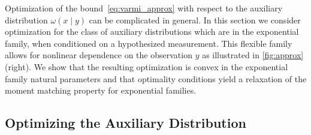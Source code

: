 

Optimization of the bound~\eqref{eq:varmi_approx} with respect to the
auxiliary distribution $\omega(x\mid y)$ can be complicated in
general.  In this section we consider optimization for the class of
auxiliary distributions which are in the exponential family, when
conditioned on a hypothesized measurement.  This flexible family
allows for nonlinear dependence on the observation $y$ as illustrated
in \FIG\ref{fig:approx} (right).  We show that the resulting
optimization is convex in the exponential family natural parameters
and that optimality conditions yield a relaxation of the moment
matching property for exponential families.



\subsection{Optimizing the Auxiliary Distribution}

